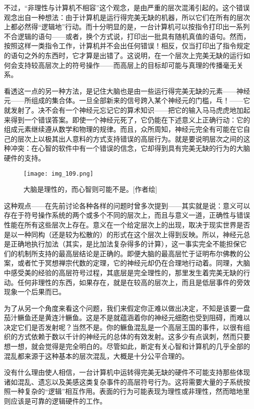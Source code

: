 不过，“非理性与计算机不相容”这个观念，是由严重的层次混淆引起的。这个错误观念出自一种想法：由于计算机是运行得完美无缺的机器，所以它们在所有的层次上都必然得“逻辑地”行动。而十分明显的是，一台计算机可以按指令打印出一系列不合逻辑的语句——或者，换个方式说，打印出一批具有随机真值的语句。然而，按照这样一类指令工作，计算机并不会出任何错误！相反，仅当打印出了指令规定的语句之外的东西时，它才算是出错了。这说明，在一个层次上完美无缺的运行如何会支持较高层次上的符号操作——而高层上的目标却可能与真理的传播毫无关系。

看透这一点的另一种方法，是记住大脑也是由一些运行得完美无缺的元素——神经元——所组成的集合体。一旦全部新来的信号跨入某个神经元的门槛，乓！——它就发射了。决不会有一个神经元忘记它的算术知识——把它的输入马马虎虎地加起来得到一个错误答案。即使一个神经元死了，它仍能在下述意义上正确行动：它的组成元素继续遵从数学和物理的规律。而且，众所周知，神经元完全有可能在它自己的层次上以极其出人意料的方式支持错误的高层行为。就是要说明层次之间的这种冲突：在心智的软件中有一个错误的信念，它却得到具有完美无缺的行为的大脑硬件的支持。

\begin{figure}
\texttt{[image: img\_109.png]}
\caption[大脑的低层与高层之间的冲突。]
  {大脑是理性的，而心智则可能不是。[作者绘] }
\end{figure}

这种观点——在先前讨论各种各样的问题时曾多次提到——其实就是说：意义可以存在于符号操作系统的两个或多个不同的层次上，而且与意义一道，正确性与错误性能在所有这些层次上存在。意义在一个给定层次上的出现，取决于现实世界是否是以一种同构（还是较为松散的）的形式在这个层次上得到反映。所以，神经元总是正确地执行加法（其实，是比加法复杂得多的计算），这一事实完全不能担保它们的机制所支持的最高层结论是正确的。即便大脑的最高层忙于证明布尔佛教的公案，或者忙于冥想禅宗代数的定理，它的神经元却仍在合理地行动着。同理，大脑中感受美的经验的高层符号过程，其底层是完全理性的，那里发生着完美无缺的行动。任何非理性的东西，如果存在，就是在较高的层次上，而且是低层事件的旁效现象一个后果而已。

为了从另一个角度来看这个问题，我们来假定你正难以做出决定，不知是该要一盘茄汁鳜鱼还是黄连汁鳜鱼。这是不是就蕴涵着你的神经元细胞也受到阻碍，而难以决定它们是否发射呢？当然不是。你的鳜鱼混乱是一个高层王国的事件，以很有组织的方式依赖于数以千计的神经元的总体的有效发射。这多少有点讽刺，然而只要想一想，就会觉得是完全明白的。尽管如此，断定有关心智和计算机的几乎全部的混乱都来源于这种基本的层次混乱，大概是十分公平合理的。

没有什么理由使人相信，一台计算机中运转得完美无缺的硬件不可能支持那些体现诸如混乱、遗忘以及美感这类复杂事件的高层符号行为。这将需要大量的子系统按照一种复杂的“逻辑”相互作用。表面的行为可能表现为理性或非理性，然而暗地里则应该是可靠的逻辑硬件的工作。

